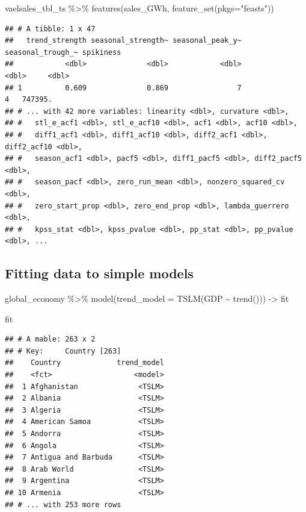 \documentclass[
]{book}
\newenvironment{Shaded}{\begin{snugshade}}{\end{snugshade}}
\newcommand{\AttributeTok}[1]{\textcolor[rgb]{0.77,0.63,0.00}{#1}}
\newcommand{\FunctionTok}[1]{\textcolor[rgb]{0.00,0.00,0.00}{#1}}
\newcommand{\NormalTok}[1]{#1}
\newcommand{\OtherTok}[1]{\textcolor[rgb]{0.56,0.35,0.01}{#1}}
\newcommand{\SpecialCharTok}[1]{\textcolor[rgb]{0.00,0.00,0.00}{#1}}
\newcommand{\StringTok}[1]{\textcolor[rgb]{0.31,0.60,0.02}{#1}}
\begin{document}
\begin{Shaded}
\begin{Highlighting}[]
\NormalTok{vaelsales\_tbl\_ts }\SpecialCharTok{\%\textgreater{}\%} \FunctionTok{features}\NormalTok{(sales\_GWh, }\FunctionTok{feature\_set}\NormalTok{(}\AttributeTok{pkgs=}\StringTok{"feasts"}\NormalTok{))}
\end{Highlighting}
\end{Shaded}

\begin{verbatim}
## # A tibble: 1 x 47
##   trend_strength seasonal_strength~ seasonal_peak_y~ seasonal_trough_~ spikiness
##            <dbl>              <dbl>            <dbl>             <dbl>     <dbl>
## 1          0.609              0.869                7                 4   747395.
## # ... with 42 more variables: linearity <dbl>, curvature <dbl>,
## #   stl_e_acf1 <dbl>, stl_e_acf10 <dbl>, acf1 <dbl>, acf10 <dbl>,
## #   diff1_acf1 <dbl>, diff1_acf10 <dbl>, diff2_acf1 <dbl>, diff2_acf10 <dbl>,
## #   season_acf1 <dbl>, pacf5 <dbl>, diff1_pacf5 <dbl>, diff2_pacf5 <dbl>,
## #   season_pacf <dbl>, zero_run_mean <dbl>, nonzero_squared_cv <dbl>,
## #   zero_start_prop <dbl>, zero_end_prop <dbl>, lambda_guerrero <dbl>,
## #   kpss_stat <dbl>, kpss_pvalue <dbl>, pp_stat <dbl>, pp_pvalue <dbl>, ...
\end{verbatim}

\hypertarget{fitting-data-to-simple-models-1}{%
\subsection{Fitting data to simple models}\label{fitting-data-to-simple-models-1}}

\begin{Shaded}
\begin{Highlighting}[]
\NormalTok{global\_economy }\SpecialCharTok{\%\textgreater{}\%} \FunctionTok{model}\NormalTok{(}\AttributeTok{trend\_model =} \FunctionTok{TSLM}\NormalTok{(GDP }\SpecialCharTok{\textasciitilde{}} \FunctionTok{trend}\NormalTok{())) }\OtherTok{{-}\textgreater{}}\NormalTok{ fit}

\NormalTok{fit}
\end{Highlighting}
\end{Shaded}

\begin{verbatim}
## # A mable: 263 x 2
## # Key:     Country [263]
##    Country             trend_model
##    <fct>                   <model>
##  1 Afghanistan              <TSLM>
##  2 Albania                  <TSLM>
##  3 Algeria                  <TSLM>
##  4 American Samoa           <TSLM>
##  5 Andorra                  <TSLM>
##  6 Angola                   <TSLM>
##  7 Antigua and Barbuda      <TSLM>
##  8 Arab World               <TSLM>
##  9 Argentina                <TSLM>
## 10 Armenia                  <TSLM>
## # ... with 253 more rows
\end{verbatim}
\end{document}
